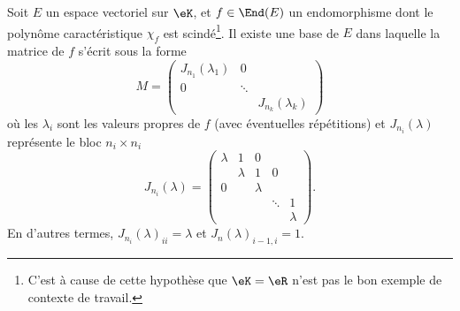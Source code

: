 \begin{theorem}        \label{ThoGGMYooPzMVpe}
	Soit \( E\) un espace vectoriel sur \( \eK\), et \( f\in\End(E)\) un endomorphisme dont le polynôme caractéristique \( \chi_f\) est scindé\footnote{C'est à cause de cette hypothèse que \( \eK=\eR\) n'est pas le bon exemple de contexte de travail.}. Il existe une base de \( E\) dans laquelle la matrice de \( f\) s'écrit sous la forme
	\begin{equation}
		M=\begin{pmatrix}
			J_{n_1}(\lambda_1) & 0      &                    \\
			0                  & \ddots &                    \\
			                   &        & J_{n_k}(\lambda_k)
		\end{pmatrix}
	\end{equation}
	où les \( \lambda_i\) sont les valeurs propres de \( f\) (avec éventuelles répétitions) et \( J_{n_i}(\lambda)\) représente le bloc \( n_i\times n_i\)
	\begin{equation}
		J_{n_i}(\lambda)=\begin{pmatrix}
			\lambda & 1       & 0       &        &         \\
			        & \lambda & 1       & 0      &         \\
			0       &         & \lambda &        &         \\
			        &         &         & \ddots & 1       \\
			        &         &         &        & \lambda
		\end{pmatrix}.
	\end{equation}
	En d'autres termes, \( J_{n_i}(\lambda)_{ii}=\lambda\) et \( J_n(\lambda)_{i-1,i}=1\).
\end{theorem}


